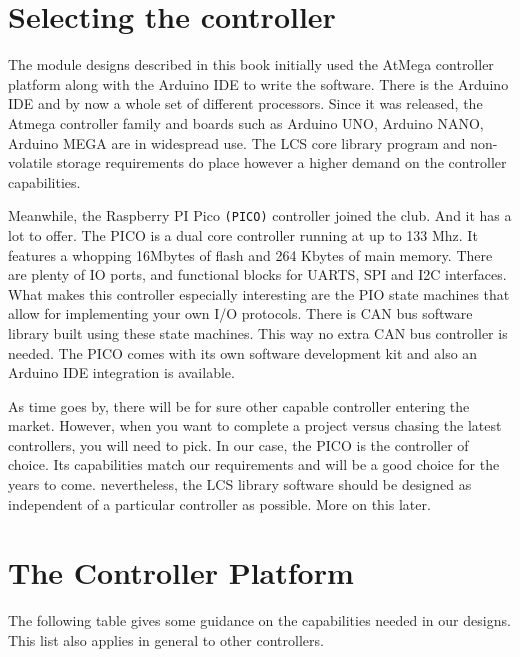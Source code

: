 \section{Selecting the controller}

The module designs described in this book initially used the AtMega controller platform along with the Arduino IDE to write the software. There is the Arduino IDE and by now a whole set of different processors. Since it was released, the Atmega controller family and boards such as Arduino UNO, Arduino NANO, Arduino MEGA are in widespread use. The LCS core library program and non-volatile storage requirements do place however a higher demand on the controller capabilities.

Meanwhile, the Raspberry PI Pico \texttt{(PICO)} controller joined the club. And it has a lot to offer. The PICO is a dual core controller running at up to 133 Mhz. It features a whopping 16Mbytes of flash and 264 Kbytes of main memory. There are plenty of IO ports, and functional blocks for UARTS, SPI and I2C interfaces. What makes this controller especially interesting are the PIO state machines that allow for implementing your own I/O protocols. There is CAN bus software library built using these state machines. This way no extra CAN bus controller is needed. The PICO comes with its own software development kit and also an Arduino IDE integration is available.

As time goes by, there will be for sure other capable controller entering the market. However, when you want to complete a project versus chasing the latest controllers, you will need to pick. In our case, the PICO is the controller of choice. Its capabilities match our requirements and will be a good choice for the years to come. nevertheless, the LCS library software should be designed as independent of a particular controller as possible. More on this later. 

\section{The Controller Platform}

 The following table gives some guidance on the capabilities needed in our designs. This list also applies in general to other controllers.


